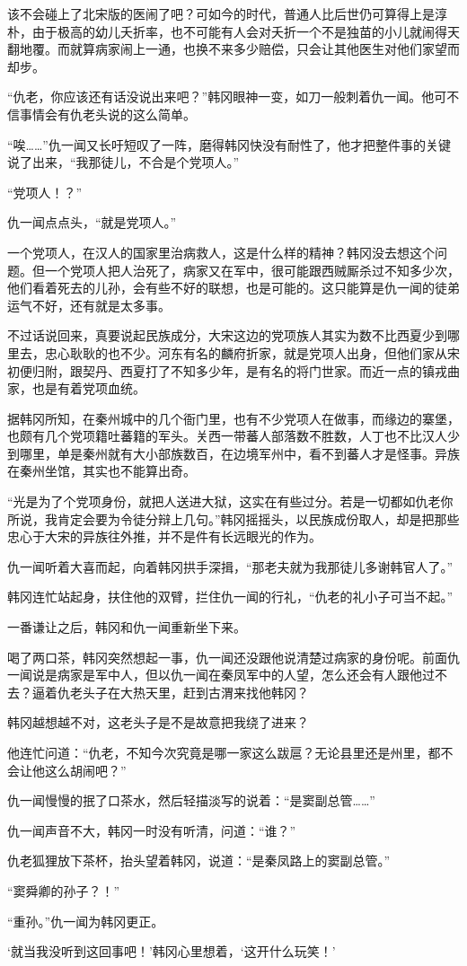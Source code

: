该不会碰上了北宋版的医闹了吧？可如今的时代，普通人比后世仍可算得上是淳朴，由于极高的幼儿夭折率，也不可能有人会对夭折一个不是独苗的小儿就闹得天翻地覆。而就算病家闹上一通，也换不来多少赔偿，只会让其他医生对他们家望而却步。

“仇老，你应该还有话没说出来吧？”韩冈眼神一变，如刀一般刺着仇一闻。他可不信事情会有仇老头说的这么简单。

“唉……”仇一闻又长吁短叹了一阵，磨得韩冈快没有耐性了，他才把整件事的关键说了出来，“我那徒儿，不合是个党项人。”

“党项人！？”

仇一闻点点头，“就是党项人。”

一个党项人，在汉人的国家里治病救人，这是什么样的精神？韩冈没去想这个问题。但一个党项人把人治死了，病家又在军中，很可能跟西贼厮杀过不知多少次，他们看着死去的儿孙，会有些不好的联想，也是可能的。这只能算是仇一闻的徒弟运气不好，还有就是太多事。

不过话说回来，真要说起民族成分，大宋这边的党项族人其实为数不比西夏少到哪里去，忠心耿耿的也不少。河东有名的麟府折家，就是党项人出身，但他们家从宋初便归附，跟契丹、西夏打了不知多少年，是有名的将门世家。而近一点的镇戎曲家，也是有着党项血统。

据韩冈所知，在秦州城中的几个衙门里，也有不少党项人在做事，而缘边的寨堡，也颇有几个党项籍吐蕃籍的军头。关西一带蕃人部落数不胜数，人丁也不比汉人少到哪里，单是秦州就有大小部族数百，在边境军州中，看不到蕃人才是怪事。异族在秦州坐馆，其实也不能算出奇。

“光是为了个党项身份，就把人送进大狱，这实在有些过分。若是一切都如仇老你所说，我肯定会要为令徒分辩上几句。”韩冈摇摇头，以民族成份取人，却是把那些忠心于大宋的异族往外推，并不是件有长远眼光的作为。

仇一闻听着大喜而起，向着韩冈拱手深揖，“那老夫就为我那徒儿多谢韩官人了。”

韩冈连忙站起身，扶住他的双臂，拦住仇一闻的行礼，“仇老的礼小子可当不起。”

一番谦让之后，韩冈和仇一闻重新坐下来。

喝了两口茶，韩冈突然想起一事，仇一闻还没跟他说清楚过病家的身份呢。前面仇一闻说是病家是军中人，但以仇一闻在秦凤军中的人望，怎么还会有人跟他过不去？逼着仇老头子在大热天里，赶到古渭来找他韩冈？

韩冈越想越不对，这老头子是不是故意把我绕了进来？

他连忙问道：“仇老，不知今次究竟是哪一家这么跋扈？无论县里还是州里，都不会让他这么胡闹吧？”

仇一闻慢慢的抿了口茶水，然后轻描淡写的说着：“是窦副总管……”

仇一闻声音不大，韩冈一时没有听清，问道：“谁？”

仇老狐狸放下茶杯，抬头望着韩冈，说道：“是秦凤路上的窦副总管。”

“窦舜卿的孙子？！”

“重孙。”仇一闻为韩冈更正。

‘就当我没听到这回事吧！’韩冈心里想着，‘这开什么玩笑！’

